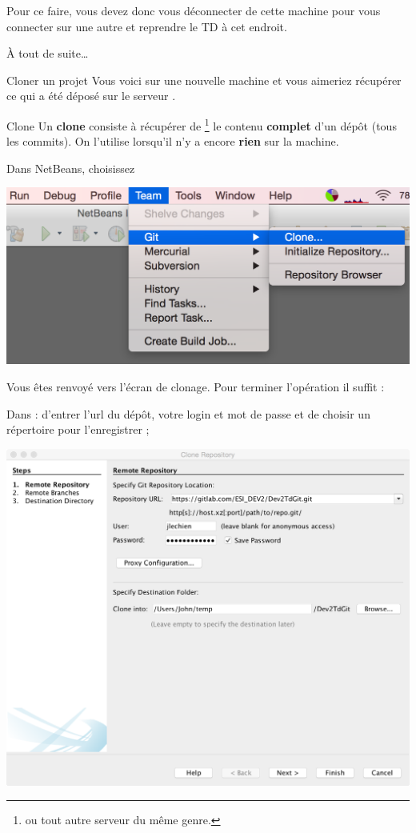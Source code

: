 \documentclass[a4paper,11pt]{style-esi/td}
\begin{document}
Pour ce faire, vous devez donc vous déconnecter de cette machine
pour vous connecter sur une autre et reprendre le TD à cet endroit.

À tout de suite\dots{}

\begin{Tutoriel}{Cloner un projet}
	Vous voici sur une nouvelle machine et vous aimeriez récupérer
	ce qui a été déposé sur le serveur .

	\begin{infoit}{Clone}
		Un \textbf{clone}
		consiste à récupérer de %
		\footnote{ou tout autre serveur du même genre.}
		le contenu \textbf{complet} d'un dépôt (tous les commits).
		On l'utilise lorsqu'il n'y a encore \textbf{rien} sur la machine.
	\end{infoit}

	\begin{steps}
	\item 
		Dans NetBeans,
		choisissez 
		\begin{center}
			\includegraphics[width=.5\textwidth]{image/NetBeans_clone01.png}
		\end{center}
	\item 
		Vous êtes renvoyé vers l'écran de clonage.
		Pour terminer l'opération il suffit :
		\begin{steps}
		\item
			Dans  : 
			d'entrer l'url du dépôt, votre login et mot de passe
			et de choisir un répertoire pour l'enregistrer ;
			\begin{center}
				\includegraphics[width=.7\textwidth]{image/NetBeans_clone03.png}

\end{center}
\end{steps}
\end{steps}
\end{Tutoriel}
\end{document}
